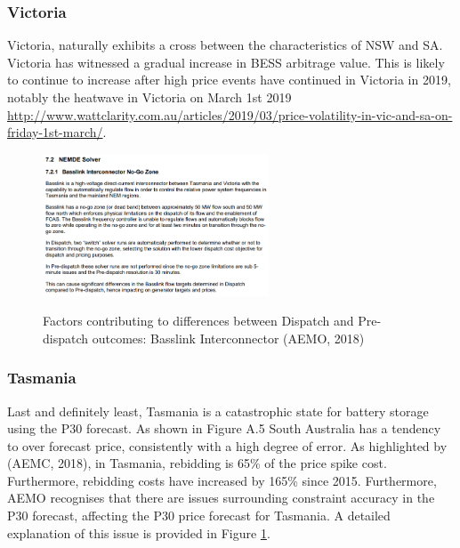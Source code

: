 \subsubsection{ Victoria }
Victoria, naturally exhibits a cross between the characteristics of NSW and SA. Victoria has witnessed a gradual increase in BESS arbitrage value. This is likely to continue to increase after high price events have continued in Victoria in 2019, notably the heatwave in Victoria on March 1st 2019 \url{http://www.wattclarity.com.au/articles/2019/03/price-volatility-in-vic-and-sa-on-friday-1st-march/}.
\begin{figure}
    \begin{center}
    \centering
    \includegraphics[width=0.6\textwidth]{Pictures/Chapter4/basslink.png}
    \label{fig:basslink}
    \caption{Factors contributing to differences between Dispatch and Pre-dispatch outcomes: Basslink Interconnector (AEMO, 2018)}
    \end{center}
\end{figure}
\subsubsection{Tasmania}
Last and definitely least, Tasmania is a catastrophic state for battery storage using the P30 forecast. As shown in Figure A.5 South Australia has a tendency to over forecast price, consistently with a high degree of error. As highlighted by (AEMC, 2018), in Tasmania, rebidding is 65\% of the price spike cost. Furthermore, rebidding costs have increased by
165\% since 2015. Furthermore, AEMO recognises that there are issues surrounding constraint accuracy in the P30 forecast, affecting the P30 price forecast for Tasmania. A detailed explanation of this issue is provided in Figure \ref{fig:basslink}.
